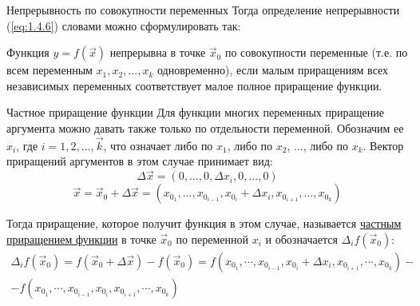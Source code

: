 \begin{tbox}{Непрерывность по совокупности переменных}
	Тогда определение непрерывности (\ref{eq:1.4.6}) словами можно сформулировать так:

	Функция $y = f(\vec{x})$ непрерывна в точке $\vec{x}_0$ по совокупности переменные (т.е. по всем  переменным $x_1, x_2, ..., x_k$ одновременно), если малым приращениям всех независимых переменных соответствует малое полное приращение функции.
\end{tbox}

\begin{tbox}{Частное приращение функции}
	Для функции многих переменных приращение аргумента можно давать также только по отдельности переменной. Обозначим ее $x_i$, где $i=1,2,..., \vec{k}$, что означает либо по $x_1$, либо по $x_2$, ..., либо по $x_k$. Вектор приращений аргументов в этом случае принимает вид:
	\[\Delta \vec{x} = (0, ..., 0, \Delta x_i, 0, ..., 0)\]
	\[\vec{x} = \vec{x}_0 + \Delta \vec{x} = (x_\text{$0_1$}, ..., x_\text{$0_{i - 1}$}, x_\text{$0_i$} + \Delta x_i, x_\text{$0_{i + 1}$}, ..., x_\text{$0_k$})\]

	Тогда приращение, которое получит функция в этом случае, называется \uline{частным приращением функции} в точке $\vec{x}_0$ по переменной $x_i$ и обозначается $\Delta_i f(\vec{x}_0)$:
	\begin{multline} \label{eq:1.4.8}
		\Delta_i f(\vec{x}_0) = f(\vec{x}_0 + \Delta \vec{x}) - f(\vec{x}_0) = f(x_\text{$0_1$}, \cdots, x_\text{$0_{i - 1}$}, x_\text{$0_i$} + \Delta x_i, x_\text{$0_{i + 1}$}, \cdots, x_\text{$0_k$}) - \\
		-f(x_\text{$0_1$}, \cdots, x_\text{$0_{i-1}$}, x_\text{$0_i$}, x_\text{$0_{i+1}$}, \cdots, x_\text{$0_k$})
	\end{multline}
\end{tbox}


